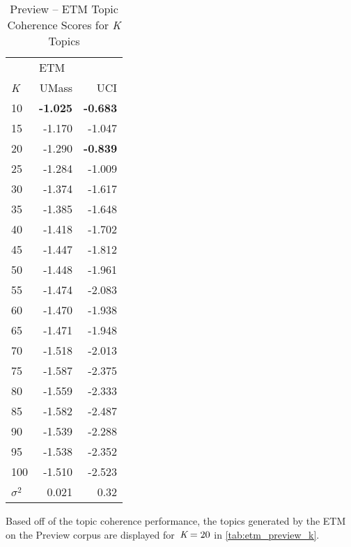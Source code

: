 \documentclass[letterpaper,12pt]{article}
\begin{document}
\begin{table}
	\caption{\label{tab:etm_preview_tc} Preview -- ETM Topic Coherence Scores for \emph{K} Topics}
	\begin{center}
		\begin{tabular}{lrr}
			\toprule
			{} & \multicolumn{2}{l}{ETM} \\
			\emph{K} &  UMass &    UCI \\
			\midrule
			10  & \textbf{-1.025} & \textbf{-0.683} \\
			15  & -1.170 & -1.047 \\
			20  & -1.290 & \textbf{-0.839} \\
			25  & -1.284 & -1.009 \\
			30  & -1.374 & -1.617 \\
			35  & -1.385 & -1.648 \\
			40  & -1.418 & -1.702 \\
			45  & -1.447 & -1.812 \\
			50  & -1.448 & -1.961 \\
			55  & -1.474 & -2.083 \\
			60  & -1.470 & -1.938 \\
			65  & -1.471 & -1.948 \\
			70  & -1.518 & -2.013 \\
			75  & -1.587 & -2.375 \\
			80  & -1.559 & -2.333 \\
			85  & -1.582 & -2.487 \\
			90  & -1.539 & -2.288 \\
			95  & -1.538 & -2.352 \\
			100 & -1.510 & -2.523 \\
			\midrule
			$\sigma^2$ & 0.021 & 0.32 \\
			\bottomrule
			\end{tabular}
	\end{center}
\end{table}

\newpage
Based off of the topic coherence performance, the topics generated by the ETM on the Preview corpus are displayed for\
$\emph{K} = 20$ in \ref{tab:etm_preview_k}.
\end{document}
